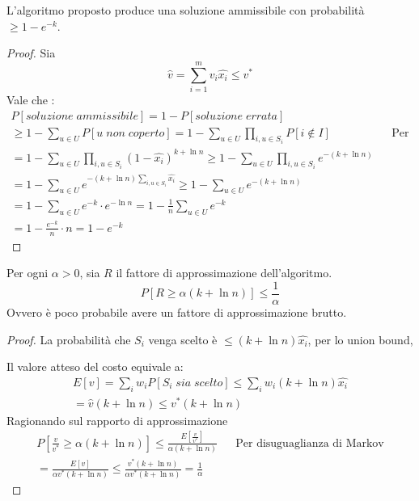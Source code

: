 \begin{theorem}
    \label{setth}
    L'algoritmo proposto produce una soluzione ammissibile con probabilità $\geq 1 - e^{-k}$.
\end{theorem}
\begin{proof}
    Sia $$\hat{v} = \sum_{i = 1}^{m} v_i\hat{x_i} \leq v^*$$
    Vale che : 
    \begin{equation}
        \begin{aligned}
            P[\mathit{soluzione \; ammissibile}] = 1 - P[\mathit{soluzione\;errata}] \\
            \geq 1 - \sum_{u \in U} P[\mathit{u \; non \; coperto}] = 1 - \sum_{u \in U} \prod_{i,u\in S_i}P[i \notin I]&& \text{Per union bound}\\
            = 1 - \sum_{u \in U} \prod_{i,u\in S_i}(1 - \hat{x_i})^{k+\ln n}\geq
            1 - \sum_{u \in U} \prod_{i,u\in S_i}e^{-(k+\ln n)}\\
            = 1 - \sum_{u \in U}e^{-(k+\ln n)\sum_{i,u\in S_i}\hat{x_i}} \geq 
            1 - \sum_{u \in U}e^{-(k+\ln n)}\\
            = 1 - \sum_{u \in U}e^{-k}\cdot e^{-\ln n} = 1 - \frac{1}{n}\sum_{u \in U}e^{-k}\\
            = 1 - \frac{e^{-k}}{n} \cdot n = 1 - e^{-k}
        \end{aligned}
    \end{equation}
\end{proof}
\begin{theorem}
    \label{setth2}
    Per ogni $\alpha > 0$, sia $R$ il fattore di approssimazione dell'algoritmo.
    $$P[R \geq \alpha(k + \ln n)] \leq \frac{1}{\alpha}$$
    Ovvero è poco probabile avere un fattore di approssimazione brutto.
\end{theorem}
\begin{proof}
    La probabilità che $S_i$ venga scelto è $\leq (k + \ln n)\hat{x_i}$, per lo union bound, 
    
    Il valore atteso del costo equivale a:
    \begin{equation}
        \begin{aligned}
            E[v] = \sum_i w_i P[S_i\;\mathit{sia \;scelto}] \leq \sum_i w_i(k + \ln n)\hat{x_i}\\
            = \hat{v}(k + \ln n) \leq v^*(k + \ln n)
        \end{aligned}
    \end{equation}
    Ragionando sul rapporto di approssimazione
    \begin{equation}
        \begin{aligned}
            P[\frac{v}{v^*}\geq \alpha(k +\ln n)]\leq \frac{E[\frac{v}{v^*}]}{\alpha(k + \ln n)} && \text{Per disuguaglianza di Markov}\\
            = \frac{E[v]}{\alpha v^* (k + \ln n)} \leq \frac{v^* (k + \ln n)}{\alpha v^* (k + \ln n)} = \frac{1}{\alpha}
        \end{aligned}
    \end{equation}
\end{proof}
